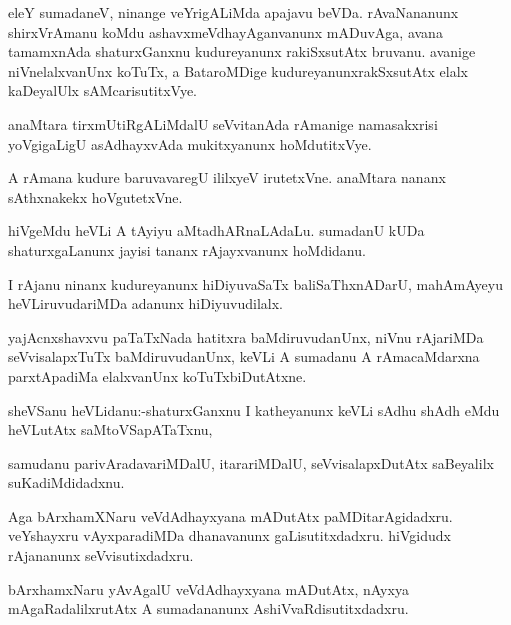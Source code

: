 \documentclass{article}
\begin{document}
\begin{mn}%
eleY sumadaneV, ninange veYrigALiMda apajavu beVDa. rAvaNananunx shirxVrAmanu koMdu 
ashavxmeVdhayAganvanunx mADuvAga, avana tamamxnAda shaturxGanxnu kudureyanunx rakiSxsutAtx
bruvanu. avanige niVnelalxvanUnx koTuTx, a BataroMDige kudureyanunxrakSxsutAtx elalx 
kaDeyalUlx sAMcarisutitxVye.
\end{mn}

\begin{mn}%
anaMtara tirxmUtiRgALiMdalU seVvitanAda rAmanige namasakxrisi yoVgigaLigU asAdhayxvAda 
mukitxyanunx hoMdutitxVye.
\end{mn}

\begin{mn}%
A rAmana kudure baruvavaregU ililxyeV irutetxVne. anaMtara nananx sAthxnakekx hoVgutetxVne.
\end{mn}

\begin{mn}%
hiVgeMdu heVLi A tAyiyu aMtadhARnaLAdaLu. sumadanU kUDa shaturxgaLanunx jayisi tananx 
rAjayxvanunx hoMdidanu.
\end{mn}

\begin{mn}%
I rAjanu ninanx kudureyanunx hiDiyuvaSaTx baliSaThxnADarU, mahAmAyeyu heVLiruvudariMDa 
adanunx hiDiyuvudilalx.
\end{mn}

\begin{mn}%
yajAcnxshavxvu paTaTxNada hatitxra baMdiruvudanUnx, niVnu rAjariMDa seVvisalapxTuTx 
baMdiruvudanUnx, keVLi A sumadanu A rAmacaMdarxna parxtApadiMa elalxvanUnx koTuTxbiDutAtxne.
\end{mn}

\begin{mn}%
sheVSanu heVLidanu:-shaturxGanxnu I katheyanunx keVLi sAdhu shAdh eMdu heVLutAtx 
saMtoVSapATaTxnu,
\end{mn}

\begin{mn}%
samudanu parivAradavariMDalU, itarariMDalU, seVvisalapxDutAtx saBeyalilx suKadiMdidadxnu.
\end{mn}

\begin{mn}%
Aga bArxhamXNaru veVdAdhayxyana mADutAtx paMDitarAgidadxru. veYshayxru vAyxparadiMDa 
dhanavanunx gaLisutitxdadxru. hiVgidudx rAjananunx seVvisutixdadxru.
\end{mn}

\begin{mn}%
bArxhamxNaru yAvAgalU veVdAdhayxyana mADutAtx, nAyxya mAgaRadalilxrutAtx A sumadananunx 
AshiVvaRdisutitxdadxru.
\end{mn}
\end{document}
